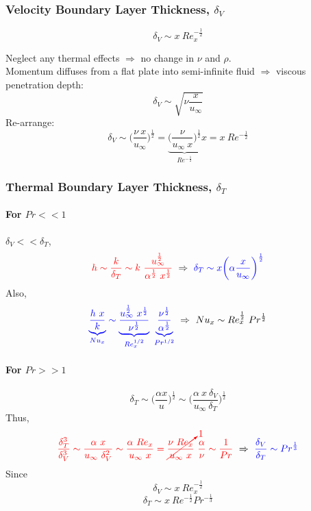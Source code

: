 \documentclass[12pt, a4paper]{article}
\begin{document}
\subsubsection{Velocity Boundary Layer Thickness, $\delta_V$}
\[
    \delta_V \sim x \ Re_{x}^{-\frac{1}{2}}
\]
\begin{tcolorbox}[breakable, title = What is the scale of $\delta_V$?]
    Neglect any thermal effects $\Rightarrow$ no change in $\nu$ and $\rho$. \\

    Momentum diffuses from a flat plate into semi-infinite fluid $\Rightarrow$ viscous penetration depth:
    \[
        \delta_V \sim \sqrt{\nu \frac{x}{u_{\infty}}}
    \]
    Re-arrange:
    \[
        \delta_V \sim \bigg( \frac{\nu \ x}{u_{\infty}} \bigg)^{\frac{1}{2}} = \underbrace{\bigg( \frac{\nu}{u_{\infty} \ x} \bigg)^{\frac{1}{2}}}_{Re^{-\frac{1}{2}}} x = \boxed{x \ Re^{-\frac{1}{2}}}
    \]
\end{tcolorbox}

\subsubsection{Thermal Boundary Layer Thickness, $\delta_T$}
\paragraph{For $Pr << 1$}
$\delta_V << \delta_T$, 
\[
    {\color{red} h \sim \frac{k}{\delta_T} \sim k \ \frac{u_{\infty}^{\frac{1}{2}}}{\alpha^{\frac{1}{2}} \ x^{\frac{1}{2}}}} \ \Rightarrow \ {\color{blue}\delta_T \sim x \bigg( \alpha \frac{x}{u_{\infty}} \bigg)^{\frac{1}{2}}}
\]
Also,
\[
    {\color{blue} \underbrace{\frac{h \ x}{k}}_{Nu_x} \sim \underbrace{\frac{u_{\infty}^{\frac{1}{2}} \ x^{\frac{1}{2}}}{\nu^{\frac{1}{2}}}}_{Re_x^{1/2}} \ \underbrace{\frac{\nu^{\frac{1}{2}}}{\alpha^{\frac{1}{2}}}}_{Pr^{1/2}}}
    \ \Rightarrow \ 
    Nu_{x} \sim Re_{x}^{\frac{1}{2}} \ Pr^{\frac{1}{2}}
\]

\paragraph{For $Pr >> 1$}
\[
    \delta_T \sim \bigg( \frac{\alpha x}{u}\bigg)^{\frac{1}{2}} \sim \bigg( \frac{\alpha \ x \ \delta_V}{u_\infty \ \delta_T}\bigg)^{\frac{1}{2}}
\]
Thus,
\[
    {\color{red}\frac{\delta_T^3}{\delta_V^3} \sim \frac{\alpha \ x}{u_\infty \ \delta_V^2} \sim \frac{\alpha \ Re_x}{u_\infty \ x} = \cancelto{1}{\frac{\nu \ Re_x}{u_\infty \ x}}\ \frac{\alpha}{\nu} \sim \frac{1}{Pr}} \ \Rightarrow \ {\color{blue}\frac{\delta_V}{\delta_T} \sim Pr^{\frac{1}{3}}}
\]
Since
\[
    \delta_V \sim x \ Re_{x}^{-\frac{1}{2}} 
\]
\[
    \delta_T \sim x \ Re^{-\frac{1}{2}} Pr^{-\frac{1}{3}}
\]
\end{document}
